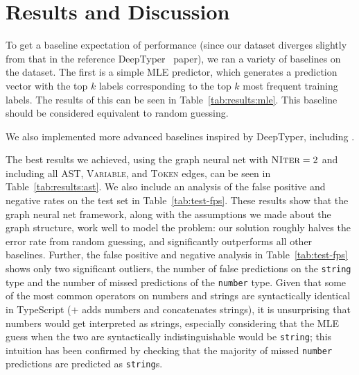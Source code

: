 \section{Results and Discussion}
\label{sec:results}

To get a baseline expectation of performance (since our dataset diverges slightly from that in the reference DeepTyper~\cite{hellendoorn2018deep} paper), we ran a variety of baselines on the dataset.
The first is a simple MLE predictor, which generates a prediction vector with the top $k$ labels corresponding to the top $k$ most frequent training labels.
The results of this can be seen in Table~\ref{tab:results:mle}.
This baseline should be considered equivalent to random guessing.

We also implemented more advanced baselines inspired by DeepTyper, including .

The best results we achieved, using the graph neural net with $\textsc{NIter}=2$ and including all AST, \textsc{Variable}, and \textsc{Token} edges, can be seen in Table~\ref{tab:results:ast}.
We also include an analysis of the false positive and negative rates on the test set in Table~\ref{tab:test-fps}.
These results show that the graph neural net framework, along with the assumptions we made about the graph structure, work well to model the problem: our solution roughly halves the error rate from random guessing, and significantly outperforms all other baselines.
Further, the false positive and negative analysis in Table~\ref{tab:test-fps} shows only two significant outliers, the number of false predictions on the \texttt{string} type and the number of missed predictions of the \texttt{number} type.
Given that some of the most common operators on numbers and strings are syntactically identical in TypeScript ($+$ adds numbers and concatenates strings), it is unsurprising that numbers would get interpreted as strings, especially considering that the MLE guess when the two are syntactically indistinguishable would be \texttt{string}; this intuition has been confirmed by checking that the majority of missed \texttt{number} predictions are predicted as \texttt{string}s.


